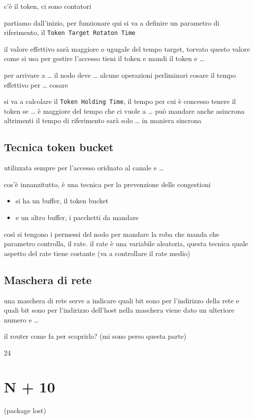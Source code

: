 \documentclass[11pt]{article}
\begin{document}
c'è il token, ci sono contatori

partiamo dall'inizio, per funzionare qui si va a definire un parametro di riferimento,
il \texttt{Token Target Rotaton Time}

il valore effettivo sarà maggiore o ugugale del tempo target, torvato questo valore come si usa per gestire l'accesso
tieni il token e mandi il token e \ldots{}

per arrivare a \ldots{} il nodo deve \ldots{} alcune operazioni perliminari
cosare il tempo effettivo per \ldots{} cosare

si va a calcolare il \texttt{Token Holding Time}, il tempo per cui è concesso tenere il token
se \ldots{} è maggiore del tempo che ci vuole a \ldots{} può mandare anche asincrona
altrimenti il tempo di riferimento sarà solo \ldots{} in maniera sincrona

\subsection{Tecnica token bucket}
\label{sec:org0f0b3ee}
utilizzata sempre per l'accesso oridnato al canale e \ldots{}

cos'è innanzitutto, è una tecnica per la prevenzione delle congestioni
\begin{itemize}
\item si ha un buffer, il token bucket
\item e un altro buffer, i pacchetti da mandare
\end{itemize}

così si tengono i permessi del nodo per mandare la roba che manda
che parametro controlla, il rate.
il rate è una variabile aleatoria, questa tecnica quale aspetto del rate tiene costante (va a controllare il rate medio)

\subsection{Maschera di rete}
\label{sec:org0ec2a64}
una maschera di rete serve a indicare quali bit sono per l'indirizzo della rete e quali bit sono per l'indirizzo dell'host
nella maschera viene dato un ulteriore numero e \ldots{}

il router come fa per scoprirlo? (mi sono perso questa parte)

24

\section{N + 10}
\label{sec:org13ab045}
(package lost)
\end{document}
